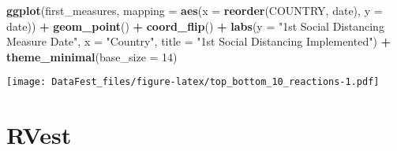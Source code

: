 \documentclass[
]{article}
\newenvironment{Shaded}{\begin{snugshade}}{\end{snugshade}}
\newcommand{\DataTypeTok}[1]{\textcolor[rgb]{0.13,0.29,0.53}{#1}}
\newcommand{\DecValTok}[1]{\textcolor[rgb]{0.00,0.00,0.81}{#1}}
\newcommand{\KeywordTok}[1]{\textcolor[rgb]{0.13,0.29,0.53}{\textbf{#1}}}
\newcommand{\NormalTok}[1]{#1}
\newcommand{\OperatorTok}[1]{\textcolor[rgb]{0.81,0.36,0.00}{\textbf{#1}}}
\newcommand{\StringTok}[1]{\textcolor[rgb]{0.31,0.60,0.02}{#1}}
\begin{document}
\begin{Shaded}
\end{Shaded}

\begin{Shaded}
\begin{Highlighting}[]
\KeywordTok{ggplot}\NormalTok{(first_measures, }\DataTypeTok{mapping =} \KeywordTok{aes}\NormalTok{(}\DataTypeTok{x =} \KeywordTok{reorder}\NormalTok{(COUNTRY, date), }\DataTypeTok{y =}\NormalTok{ date)) }\OperatorTok{+}
\StringTok{  }\KeywordTok{geom_point}\NormalTok{() }\OperatorTok{+}\StringTok{ }\KeywordTok{coord_flip}\NormalTok{() }\OperatorTok{+}\StringTok{ }
\StringTok{  }\KeywordTok{labs}\NormalTok{(}\DataTypeTok{y =} \StringTok{"1st Social Distancing Measure Date"}\NormalTok{, }\DataTypeTok{x =} \StringTok{"Country"}\NormalTok{,}
       \DataTypeTok{title =} \StringTok{"1st Social Distancing Implemented"}\NormalTok{) }\OperatorTok{+}\StringTok{ }
\StringTok{  }\KeywordTok{theme_minimal}\NormalTok{(}\DataTypeTok{base_size =} \DecValTok{14}\NormalTok{)}
\end{Highlighting}
\end{Shaded}

\texttt{[image: DataFest\_files/figure-latex/top\_bottom\_10\_reactions-1.pdf]}

\hypertarget{rvest}{%
\section{RVest}\label{rvest}}
\end{document}
